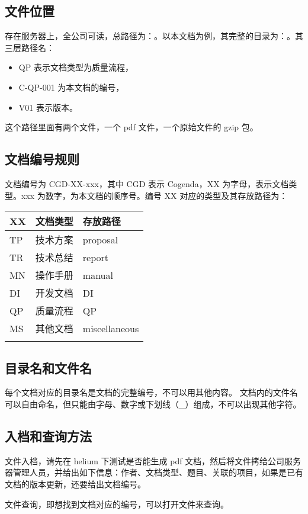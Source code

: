 \subsection{文件位置}
存在服务器上，全公司可读，总路径为：。以本文档为例，其完整的目录为：。其三层路径名：
\begin{itemize}
\item QP 表示文档类型为质量流程，
\item C-QP-001 为本文档的编号，
\item V01 表示版本。
\end{itemize}
这个路径里面有两个文件，一个 pdf 文件，一个原始文件的 gzip 包。

\subsection{文档编号规则}
文档编号为 CGD-XX-xxx，其中 CGD 表示 Cogenda，XX 为字母，表示文档类型。xxx 为数字，为本文档的顺序号。编号 XX 对应的类型及其存放路径为：

\begin{tabular}{lll} \thickhline
\bf XX & \bf 文档类型 & \bf 存放路径 \\ \hline
TP & 技术方案 & proposal \\
TR & 技术总结 & report \\
MN & 操作手册 & manual \\
DI & 开发文档 & DI \\
QP & 质量流程 & QP \\
MS & 其他文档 & miscellaneous \\
\thickhline \end{tabular}

\subsection{目录名和文件名}
每个文档对应的目录名是文档的完整编号，不可以用其他内容。
文档内的文件名可以自由命名，但只能由字母、数字或下划线（\_）组成，不可以出现其他字符。

\subsection{入档和查询方法}
文件入档，请先在 helium 下测试是否能生成 pdf 文档，然后将文件拷给公司服务器管理人员，并给出如下信息：作者、文档类型、题目、关联的项目，如果是已有文档的版本更新，还要给出文档编号。

文件查询，即想找到文档对应的编号，可以打开文件来查询。

